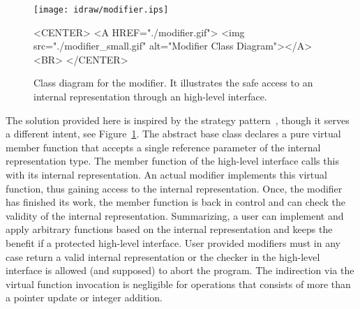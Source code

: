 \begin{figure}
\begin{ccTexOnly}
    \begin{center}
      \parbox{\textwidth}{%
          \texttt{[image: idraw/modifier.ips]}%
      }
    \end{center}
\end{ccTexOnly}

    \caption{Class diagram for the modifier. It illustrates the
             safe access to an internal representation through an
             high-level interface.
    \label{figureModifierDesign}}

\begin{ccHtmlOnly}
    <CENTER>
    <A HREF="./modifier.gif">
        <img src="./modifier_small.gif" alt="Modifier Class Diagram"></A><BR>
    </CENTER>
\end{ccHtmlOnly}
\end{figure}

The solution provided here is inspired by the strategy
pattern~\cite{cgal:ghjv-dpero-95}, though it serves a different intent, see
Figure~\ref{figureModifierDesign}.  The abstract base class
 declares a pure virtual member function
 that accepts a single reference parameter of the
internal representation type. The member function  of
the high-level interface calls this  with its internal
representation.  An actual modifier implements this virtual function,
thus gaining access to the internal representation. Once, the modifier
has finished its work, the member function  is back in
control and can check the validity of the internal representation.
Summarizing, a user can implement and apply arbitrary functions based
on the internal representation and keeps the benefit if a protected
high-level interface. User provided modifiers must in any case return
a valid internal representation or the checker in the high-level
interface is allowed (and supposed) to abort the program. The
indirection via the virtual function invocation is negligible for
operations that consists of more than a pointer update or integer
addition.





\ccParDims
\beforecprogskip\parskip
{}



